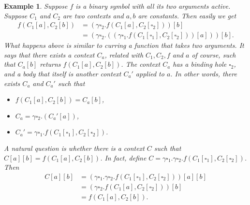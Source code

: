 \documentclass{article}
\theoremstyle{plain}
\newtheorem{eg}[thm]{Example}
\begin{document}
\begin{eg}
	Suppose $f$ is a binary symbol with all its two arguments active. Suppose $C_1$ and $C_2$ are two contexts and $a, b$ are constants. Then easily we get
	\begin{align*}
	f(C_1[a],C_2[b])
	&= (\gamma \square_2 . f(C_1[a], C_2[\square_2]))[b] \\
	&= (\gamma \square_2 . ((\gamma \square_1 . f(C_1[\square_1], C_2[\square_2])) [a] )) [b].
	\end{align*}
	What happens above is similar to \emph{curring} a function that takes two arguments. It says that there exists a context $C_a$, related with $C_1, C_2, f$ and $a$ of course, such that $C_a[b]$ returns $f(C_1[a],C_2[b])$. The context $C_a$ has a binding hole $\square_2$, and a body that itself is another context $C_a'$ applied to $a$. In other words, there exists $C_a$ and $C_a'$ such that 
	\begin{itemize}
	\item $f(C_1[a],C_2[b]) = C_a[b]$,
	\item $C_a = \gamma \square_2 . (C_a'[a])$,
	\item $C_a' = \gamma \square_1 . f(C_1[\square_1], C_2[\square_2])$.
	\end{itemize}
	
	A natural question is whether there is a context $C$ such that $C[a][b] = f(C_1[a],C_2[b])$. In fact, define $C = \gamma \square_1 . \gamma \square_2 . f(C_1[\square_1], C_2[\square_2])$. Then
	\begin{align*}
	C[a][b]
	&= (\gamma \square_1 . \gamma \square_2 . f(C_1[\square_1], C_2[\square_2])) [a] [b] \\
	&= (\gamma \square_2 . f(C_1[a], C_2[\square_2])) [b] \\
	&= f(C_1[a], C_2[b]).
	\end{align*}
\end{eg}
\end{document}
